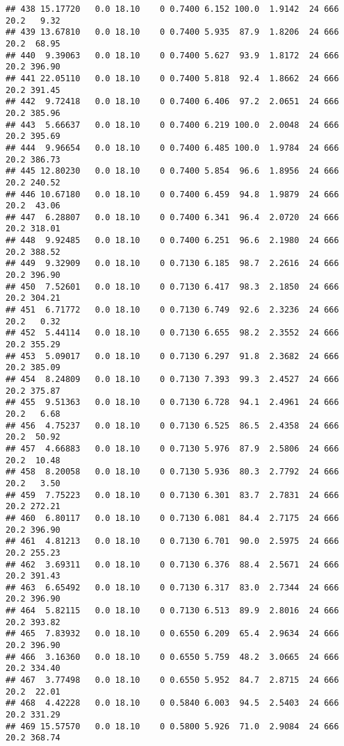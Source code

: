 \documentclass[
]{article}
\begin{document}
\begin{verbatim}
## 438 15.17720   0.0 18.10    0 0.7400 6.152 100.0  1.9142  24 666    20.2   9.32
## 439 13.67810   0.0 18.10    0 0.7400 5.935  87.9  1.8206  24 666    20.2  68.95
## 440  9.39063   0.0 18.10    0 0.7400 5.627  93.9  1.8172  24 666    20.2 396.90
## 441 22.05110   0.0 18.10    0 0.7400 5.818  92.4  1.8662  24 666    20.2 391.45
## 442  9.72418   0.0 18.10    0 0.7400 6.406  97.2  2.0651  24 666    20.2 385.96
## 443  5.66637   0.0 18.10    0 0.7400 6.219 100.0  2.0048  24 666    20.2 395.69
## 444  9.96654   0.0 18.10    0 0.7400 6.485 100.0  1.9784  24 666    20.2 386.73
## 445 12.80230   0.0 18.10    0 0.7400 5.854  96.6  1.8956  24 666    20.2 240.52
## 446 10.67180   0.0 18.10    0 0.7400 6.459  94.8  1.9879  24 666    20.2  43.06
## 447  6.28807   0.0 18.10    0 0.7400 6.341  96.4  2.0720  24 666    20.2 318.01
## 448  9.92485   0.0 18.10    0 0.7400 6.251  96.6  2.1980  24 666    20.2 388.52
## 449  9.32909   0.0 18.10    0 0.7130 6.185  98.7  2.2616  24 666    20.2 396.90
## 450  7.52601   0.0 18.10    0 0.7130 6.417  98.3  2.1850  24 666    20.2 304.21
## 451  6.71772   0.0 18.10    0 0.7130 6.749  92.6  2.3236  24 666    20.2   0.32
## 452  5.44114   0.0 18.10    0 0.7130 6.655  98.2  2.3552  24 666    20.2 355.29
## 453  5.09017   0.0 18.10    0 0.7130 6.297  91.8  2.3682  24 666    20.2 385.09
## 454  8.24809   0.0 18.10    0 0.7130 7.393  99.3  2.4527  24 666    20.2 375.87
## 455  9.51363   0.0 18.10    0 0.7130 6.728  94.1  2.4961  24 666    20.2   6.68
## 456  4.75237   0.0 18.10    0 0.7130 6.525  86.5  2.4358  24 666    20.2  50.92
## 457  4.66883   0.0 18.10    0 0.7130 5.976  87.9  2.5806  24 666    20.2  10.48
## 458  8.20058   0.0 18.10    0 0.7130 5.936  80.3  2.7792  24 666    20.2   3.50
## 459  7.75223   0.0 18.10    0 0.7130 6.301  83.7  2.7831  24 666    20.2 272.21
## 460  6.80117   0.0 18.10    0 0.7130 6.081  84.4  2.7175  24 666    20.2 396.90
## 461  4.81213   0.0 18.10    0 0.7130 6.701  90.0  2.5975  24 666    20.2 255.23
## 462  3.69311   0.0 18.10    0 0.7130 6.376  88.4  2.5671  24 666    20.2 391.43
## 463  6.65492   0.0 18.10    0 0.7130 6.317  83.0  2.7344  24 666    20.2 396.90
## 464  5.82115   0.0 18.10    0 0.7130 6.513  89.9  2.8016  24 666    20.2 393.82
## 465  7.83932   0.0 18.10    0 0.6550 6.209  65.4  2.9634  24 666    20.2 396.90
## 466  3.16360   0.0 18.10    0 0.6550 5.759  48.2  3.0665  24 666    20.2 334.40
## 467  3.77498   0.0 18.10    0 0.6550 5.952  84.7  2.8715  24 666    20.2  22.01
## 468  4.42228   0.0 18.10    0 0.5840 6.003  94.5  2.5403  24 666    20.2 331.29
## 469 15.57570   0.0 18.10    0 0.5800 5.926  71.0  2.9084  24 666    20.2 368.74

\end{verbatim}
\end{document}
